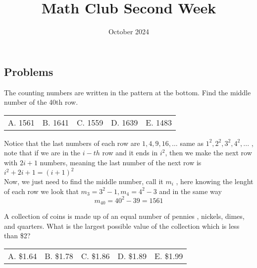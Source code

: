 \documentclass[12pt]{article}
\title{Math Club Second Week}
\date{October 2024}
\makeatletter
\newcounter{problem}
\newcommand{\multChoice}[5]{
    \begin{tabular}{l @{\hskip 1.5cm} l @{\hskip 1.5cm} l @{\hskip 1.5cm} l @{\hskip 1.5cm} l}
    A. #1 & B. #2 & C. #3 & D. #4 & E. #5
\end{tabular}

}
\newcommand{\myVertex}[3]{
    \Vertex[x=#1,y=#2,size=0.5,label=$#3$,position=90,fontscale=2,style={color=blue}]{#3}
}
\makeatother
\begin{document}
\maketitle

 \begin{spacing}{1.3}

\section*{Problems}

\begin{problem}
   The counting numbers are written in the pattern at
   the bottom. Find the middle number of the 40th row. 
   \begin{centering}
    \vskip 0.7cm
\end{centering}
\multChoice{1561}{1641}{1559}{1639}{1483}  
\end{problem}

\begin{solution}[1561]
      Notice that the last numbers of each row are $1,4,9,16,\ldots$ same as 
      $1^2,2^2,3^2,4^2,...$ , note that if we are in the $i-th$ row and it ends in $i^2$, then
      we make the next row with $2i+1$ numbers, meaning the last number of the next row is
      $i^2+2i+1=(i+1)^2$ \\
      Now, we just need to find the middle number, call it $m_i$ , here knowing the lenght of
      each row we look that $m_3=3^2-1, m_4=4^2-3$ and in the same way 
      $$m_{40}=40^2-39=1561$$
\end{solution}

\begin{problem}
   A collection of coins is made up of an equal number of pennies
   , nickels, dimes, and quarters. What is the largest possible
   value of the collection which is less than \$2? \\
   \multChoice{\$1.64}{\$1.78}{\$1.86}{\$1.89}{\$1.99}
\end{problem}


\end{spacing}
\end{document}
